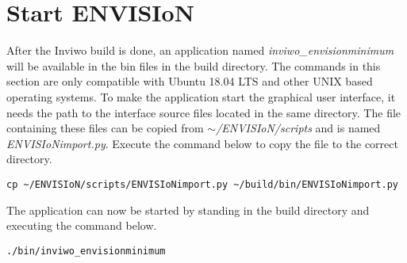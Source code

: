 \section{Start ENVISIoN}
After the Inviwo build is done, an application named \textit{inviwo\_envisionminimum} will be available in the bin files in the build directory. The commands in this section are only compatible with Ubuntu 18.04 LTS and other UNIX based operating systems. To make the application start the graphical user interface, it needs the path to the interface source files located in the same directory. The file containing these files can be copied from \emph{$\sim$/ENVISIoN/scripts} and is named \textit{ENVISIoNimport.py}. Execute the command below to copy the file to the correct directory.

\begin{lstlisting}[frame = single, breaklines = true]
    cp ~/ENVISIoN/scripts/ENVISIoNimport.py ~/build/bin/ENVISIoNimport.py
\end{lstlisting}

The application can now be started by standing in the build directory and executing the command below.

\begin{lstlisting}[frame = single, breaklines = true]
    ./bin/inviwo_envisionminimum
\end{lstlisting}
